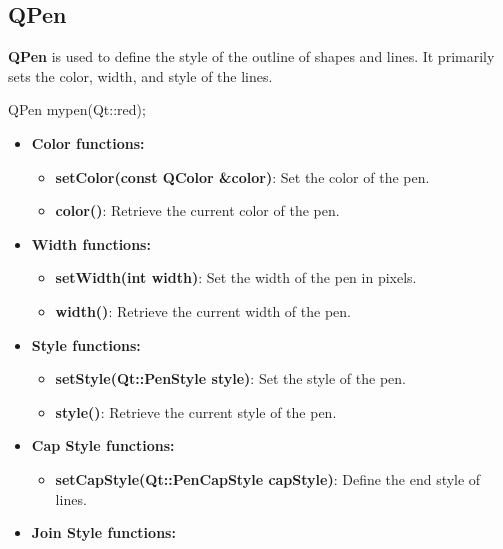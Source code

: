 \documentclass{report}
\begin{document}
    \pagebreak
    \subsection{QPen}
    \bigbreak \noindent 
    \begin{concept}
        \textbf{QPen} is used to define the style of the outline of shapes and lines. It primarily sets the color, width, and style of the lines.
        \bigbreak \noindent 
        \begin{cppcode}
            QPen mypen(Qt::red);
        \end{cppcode}
        \begin{itemize}
            \item \textbf{Color functions:} 
                \begin{itemize}
                    \item \textbf{setColor(const QColor \&color)}: Set the color of the pen.
                    \item \textbf{color()}: Retrieve the current color of the pen.
                \end{itemize}
            \item \textbf{Width functions:} 
                \begin{itemize}
                    \item \textbf{setWidth(int width)}: Set the width of the pen in pixels.
                    \item \textbf{width()}: Retrieve the current width of the pen.
                \end{itemize}
            \item \textbf{Style functions:} 
                \begin{itemize}
                    \item \textbf{setStyle(Qt::PenStyle style)}: Set the style of the pen.
                    \item \textbf{style()}: Retrieve the current style of the pen.
                \end{itemize}
            \item \textbf{Cap Style functions:} 
                \begin{itemize}
                    \item \textbf{setCapStyle(Qt::PenCapStyle capStyle)}: Define the end style of lines.
                \end{itemize}
            \item \textbf{Join Style functions:} 
                \begin{itemize}

\end{itemize}
\end{itemize}
\end{concept}
\end{document}
